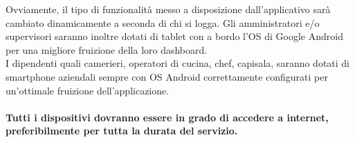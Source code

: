 \documentclass{article}
\numberwithin{equation}{section}
\numberwithin{figure}{section}
\begin{document}
   {\large Ovviamente, il tipo di funzionalità messo a disposizione dall'applicativo sarà cambiato
   dinamicamente a seconda di chi si logga. 
    Gli amministratori e/o supervisori saranno inoltre dotati di tablet con a bordo l'OS di Google Android per
    una migliore fruizione della loro dashboard.
    \\

    I dipendenti quali camerieri, operatori di cucina, chef, capisala, saranno dotati di smartphone aziendali sempre con OS Android correttamente configurati per un'ottimale fruizione dell'applicazione.
    \\\\
    \textbf{Tutti i dispositivi dovranno essere in grado di accedere a internet, preferibilmente per tutta la durata del servizio.} 
    }
    




\end{document}
